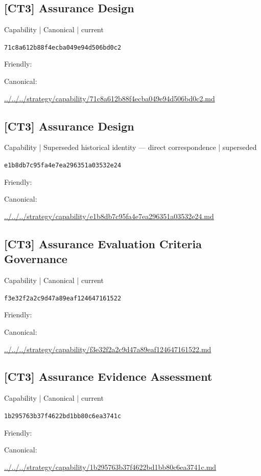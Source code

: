 \documentclass[10pt,a4paper]{article}
\begin{document}
\subsection*{[CT3] Assurance Design}
{\small Capability | Canonical | current}\par
\texttt{71c8a612b88f4ecba049e94d506bd0c2}\par
Friendly: \par
Canonical: \par
{\footnotesize\url{../../../strategy/capability/71c8a612b88f4ecba049e94d506bd0c2.md}}\par
\subsection*{[CT3] Assurance Design}
{\small Capability | Superseded historical identity — direct correspondence | superseded}\par
\texttt{e1b8db7c95fa4e7ea296351a03532e24}\par
Friendly: \par
Canonical: \par
{\footnotesize\url{../../../strategy/capability/e1b8db7c95fa4e7ea296351a03532e24.md}}\par
\subsection*{[CT3] Assurance Evaluation Criteria Governance}
{\small Capability | Canonical | current}\par
\texttt{f3e32f2a2c9d47a89eaf124647161522}\par
Friendly: \par
Canonical: \par
{\footnotesize\url{../../../strategy/capability/f3e32f2a2c9d47a89eaf124647161522.md}}\par
\subsection*{[CT3] Assurance Evidence Assessment}
{\small Capability | Canonical | current}\par
\texttt{1b295763b37f4622bd1bb80c6ea3741c}\par
Friendly: \par
Canonical: \par
{\footnotesize\url{../../../strategy/capability/1b295763b37f4622bd1bb80c6ea3741c.md}}\par
\end{document}
